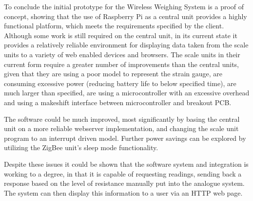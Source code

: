 To conclude the initial prototype for the Wireless Weighing System is a proof of concept, showing that the use of Raspberry Pi as a central unit provides a highly functional platform, which meets the requirements specified by the client. Although some work is still required on the central unit, in its current state it provides a relatively reliable environment for displaying data taken from the scale units to a variety of web enabled devices and browsers. The scale units in their current form require a greater number of improvements than the central units, given that they are using a poor model to represent the strain gauge, are consuming excessive power (reducing battery life to below specified time), are much larger than specified, are using a microcontroller with an excessive overhead and using a makeshift interface between microcontroller and breakout PCB. 

The software could be much improved, most significantly by basing the central unit on a more reliable webserver implementation, and changing the scale unit program to an interrupt driven model. Further power savings can be explored by utilizing the ZigBee unit's sleep mode functionality.

Despite these issues it could be shown that the software system and integration is working to a degree, in that it is capable of requesting readings, sending back a response based on the level of resistance manually put into the analogue system. The system can then display this information to a user via an HTTP web page.

